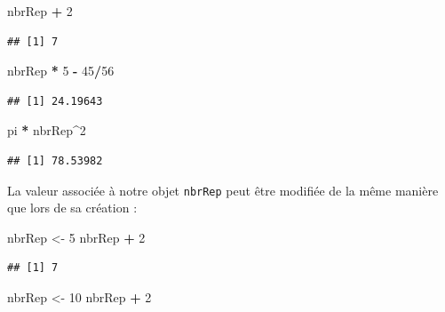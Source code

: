 \documentclass[]{book}
\newenvironment{Shaded}{\begin{snugshade}}{\end{snugshade}}
\newcommand{\DecValTok}[1]{\textcolor[rgb]{0.00,0.00,0.81}{#1}}
\newcommand{\NormalTok}[1]{#1}
\newcommand{\OperatorTok}[1]{\textcolor[rgb]{0.81,0.36,0.00}{\textbf{#1}}}
\newcommand{\StringTok}[1]{\textcolor[rgb]{0.31,0.60,0.02}{#1}}
\begin{document}
\begin{Shaded}
\begin{Highlighting}[]
\NormalTok{nbrRep }\OperatorTok{+}\StringTok{ }\DecValTok{2}
\end{Highlighting}
\end{Shaded}

\begin{verbatim}
## [1] 7
\end{verbatim}

\begin{Shaded}
\begin{Highlighting}[]
\NormalTok{nbrRep }\OperatorTok{*}\StringTok{ }\DecValTok{5} \OperatorTok{-}\StringTok{ }\DecValTok{45}\OperatorTok{/}\DecValTok{56}
\end{Highlighting}
\end{Shaded}

\begin{verbatim}
## [1] 24.19643
\end{verbatim}

\begin{Shaded}
\begin{Highlighting}[]
\NormalTok{pi }\OperatorTok{*}\StringTok{ }\NormalTok{nbrRep}\OperatorTok{^}\DecValTok{2}
\end{Highlighting}
\end{Shaded}

\begin{verbatim}
## [1] 78.53982
\end{verbatim}

La valeur associée à notre objet \texttt{nbrRep} peut être modifiée de la même manière que lors de sa création :

\begin{Shaded}
\begin{Highlighting}[]
\NormalTok{nbrRep <-}\StringTok{ }\DecValTok{5}
\NormalTok{nbrRep }\OperatorTok{+}\StringTok{ }\DecValTok{2}
\end{Highlighting}
\end{Shaded}

\begin{verbatim}
## [1] 7
\end{verbatim}

\begin{Shaded}
\begin{Highlighting}[]
\NormalTok{nbrRep <-}\StringTok{ }\DecValTok{10}
\NormalTok{nbrRep }\OperatorTok{+}\StringTok{ }\DecValTok{2}
\end{Highlighting}
\end{Shaded}
\end{document}
